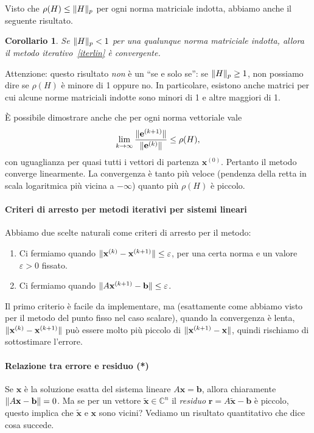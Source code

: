 \documentclass[a4paper]{report}
\DeclarePairedDelimiter{\norm}{\lVert}{\rVert}
\newtheorem{corollary}[theorem]{Corollario}
\theoremstyle{definition}
\theoremstyle{remark}
\newcommand{\x}{\mathbf{x}}
\newcommand{\e}{\mathbf{e}}
\renewcommand{\b}{\mathbf{b}}
\begin{document}
Visto che $\rho(H) \leq \norm{H}_p$ per ogni norma matriciale indotta, abbiamo anche il seguente risultato.
\begin{corollary}
Se $\norm{H}_p < 1$ per una qualunque norma matriciale indotta, allora il metodo iterativo~\eqref{iterlin} è convergente.
\end{corollary}
Attenzione: questo risultato \emph{non} è un ``se e solo se'': se $\norm{H}_p \geq 1$, non possiamo dire se $\rho(H)$ è minore di 1 oppure no. In particolare, esistono anche matrici per cui alcune norme matriciali indotte sono minori di 1 e altre maggiori di 1.

È possibile dimostrare anche che per ogni norma vettoriale vale
\[
\lim_{k\to\infty} \frac{\norm{\e^{(k+1)}}}{\norm{\e^{(k)}}} \leq \rho(H),
\]
con uguaglianza per quasi tutti i vettori di partenza $\x^{(0)}$. Pertanto il metodo converge linearmente. La convergenza è tanto più veloce (pendenza della retta in scala logaritmica più vicina a $-\infty$) quanto più $\rho(H)$ è piccolo.

\paragraph{Criteri di arresto per metodi iterativi per sistemi lineari}
Abbiamo due scelte naturali come criteri di arresto per il metodo:
\begin{enumerate}
    \item Ci fermiamo quando $\norm{\x^{(k)} - \x^{(k+1)}} \leq \varepsilon$, per una certa norma e un valore $\varepsilon > 0$ fissato.
    \item Ci fermiamo quando $\norm{A \x^{(k+1)} - \b} \leq \varepsilon$.
\end{enumerate}
Il primo criterio è facile da implementare, ma (esattamente come abbiamo visto per il metodo del punto fisso nel caso scalare), quando la convergenza è lenta, $\norm{\x^{(k)} - \x^{(k+1)}}$ può essere molto più piccolo di $\norm{\x^{(k+1)} - \x}$, quindi rischiamo di sottostimare l'errore.

\paragraph{Relazione tra errore e residuo (*)}  Se $\x$ è la soluzione esatta del sistema lineare $A\x = \b$, allora chiaramente $\norm{A\x-\b} = 0$. Ma se per un vettore $\tilde{\x} \in \mathbb{C}^n$ il \emph{residuo} $\mathbf{r} = A\tilde{\x}-\b$ è piccolo, questo implica che $\tilde{\x}$ e $\x$ sono vicini? Vediamo un risultato quantitativo che dice cosa succede.
\end{document}
